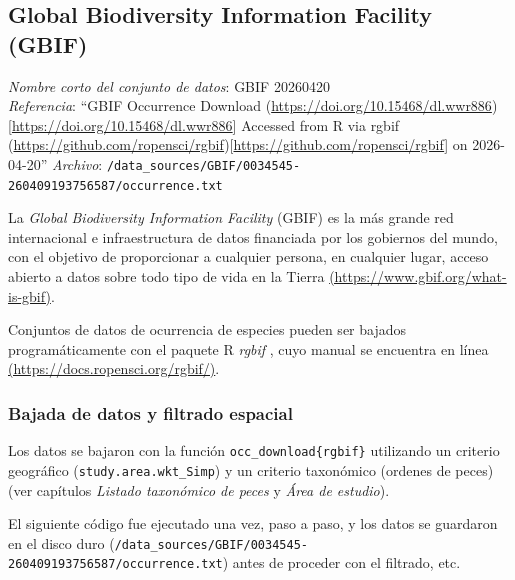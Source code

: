 \documentclass[sn-apa,pdflatex]{sn-jnl}
\begin{document}
\subsection{Global Biodiversity Information Facility
(GBIF)}\label{global-biodiversity-information-facility-gbif}

\emph{Nombre corto del conjunto de datos}: GBIF 20260420\\
\emph{Referencia}: ``GBIF Occurrence Download
(\url{https://doi.org/10.15468/dl.wwr886}){[}\url{https://doi.org/10.15468/dl.wwr886}{]}
Accessed from R via rgbif
(\url{https://github.com/ropensci/rgbif}){[}\url{https://github.com/ropensci/rgbif}{]}
on 2026-04-20'' \emph{Archivo}:
\texttt{/data\_sources/GBIF/0034545-260409193756587/occurrence.txt}

La \emph{Global Biodiversity Information Facility} (GBIF) es la más
grande red internacional e infraestructura de datos financiada por los
gobiernos del mundo, con el objetivo de proporcionar a cualquier
persona, en cualquier lugar, acceso abierto a datos sobre todo tipo de
vida en la Tierra
\href{https://www.gbif.org/what-is-gbif}{(https://www.gbif.org/what-is-gbif)}.

Conjuntos de datos de ocurrencia de especies pueden ser bajados
programáticamente con el paquete R \emph{rgbif} \citep{Chamberlain2025},
cuyo manual se encuentra en línea
\href{https://docs.ropensci.org/rgbif/}{(https://docs.ropensci.org/rgbif/)}.

\subsubsection{Bajada de datos y filtrado
espacial}\label{bajada-de-datos-y-filtrado-espacial}

Los datos se bajaron con la función \texttt{occ\_download\{rgbif\}}
utilizando un criterio geográfico (\texttt{study.area.wkt\_Simp}) y un
criterio taxonómico (ordenes de peces) (ver capítulos \emph{Listado
taxonómico de peces} y \emph{Área de estudio}).

El siguiente código fue ejecutado una vez, paso a paso, y los datos se
guardaron en el disco duro
(\texttt{/data\_sources/GBIF/0034545-260409193756587/occurrence.txt})
antes de proceder con el filtrado, etc.
\end{document}
